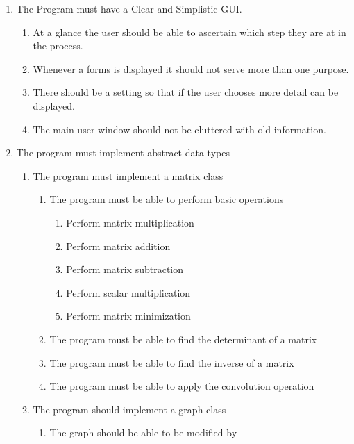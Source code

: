 \begin{flushleft}
\begin{enumerate}
            \item The Program must have a Clear and Simplistic GUI.
            \begin{enumerate}
                \item At a glance the user should be able to ascertain which step they are at in the process.
                \item Whenever a forms is displayed it should not serve more than one purpose.
                \item There should be a setting so that if the user chooses more detail can be displayed.
                \item The main user window should not be cluttered with old information.
            \end{enumerate}          

            \item The program must implement abstract data types
            \begin{enumerate}
                \item The program must implement a matrix class
                \begin{enumerate}
                    \item The program must be able to perform basic operations
                    \begin{enumerate}
                        \item Perform matrix multiplication
                        \item Perform matrix addition
                        \item Perform matrix subtraction
                        \item Perform scalar multiplication
                        \item Perform matrix minimization
                \end{enumerate}
                \item The program must be able to find the determinant of a matrix
                \item The program must be able to find the inverse of a matrix
                \item The program must be able to apply the convolution operation
                \end{enumerate}
                \item The program should implement a graph class
                \begin{enumerate}
                    \item The graph should be able to be modified by

\end{enumerate}
\end{enumerate}
\end{enumerate}
\end{flushleft}
